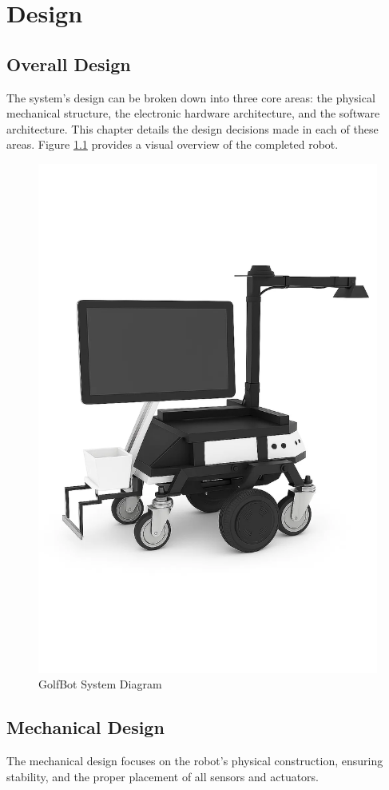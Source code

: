 \chapter{Design}
\label{chap:design}

\section{Overall Design}
\label{sec:overall_design}
The system's design can be broken down into three core areas: the physical mechanical structure, the electronic hardware architecture, and the software architecture. This chapter details the design decisions made in each of these areas. Figure \ref{fig:golfbot_system_diagram} provides a visual overview of the completed robot.

\begin{figure}[h!]
    \centering
    \includegraphics[width=0.7\linewidth]{figures/complete.png}
    \caption{GolfBot System Diagram}
    \label{fig:golfbot_system_diagram}
\end{figure}

\section{Mechanical Design}
\label{sec:mechanical_design}
The mechanical design focuses on the robot's physical construction, ensuring stability, and the proper placement of all sensors and actuators.


